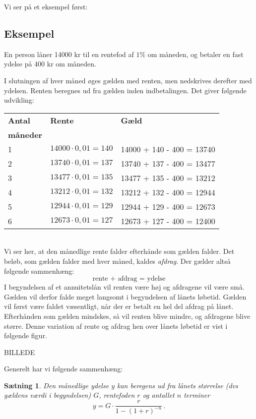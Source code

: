 \documentclass[12pt,oneside,a4paper]{article}
\newtheorem{thm}{Sætning}[section]
\begin{document}
Vi ser på et eksempel først:
\begin{tcolorbox}
\subsection{Eksempel}
En person låner 14000 kr til en rentefod af $1\%$ om måneden, og betaler en fast
ydelse på 400 kr om måneden.

I slutningen af hver måned øges gælden med renten, men nedskrives derefter med
ydelsen. Renten beregnes ud fra gælden inden indbetalingen.  Det giver
følgende udvikling:
\\

\begin{tabular}{|l|l|l|}
    \hline
    \textbf{Antal} & \textbf{Rente} & \textbf{Gæld} \\
    \textbf{måneder} &  & \\
    \hline
    1 & $14000\cdot 0,01 = 140$ & 14000 + 140 - 400 = 13740 \\
    \hline
    2 & $13740\cdot 0,01 = 137$ & 13740 + 137 - 400 = 13477 \\
    \hline
    3 & $13477\cdot 0,01 = 135$ & 13477 + 135 - 400 = 13212 \\
    \hline
    4 & $13212\cdot 0,01 = 132$ & 13212 + 132 - 400 = 12944 \\
    \hline
    5 & $12944\cdot 0,01 = 129$ & 12944 + 129 - 400 = 12673 \\
    \hline
    6 & $12673\cdot 0,01 = 127$ & 12673 + 127 - 400 = 12400 \\
    \hline
\end{tabular}
\\

Vi ser her, at den månedlige rente falder efterhånde som gælden falder. Det
beløb, som gælden falder med hver måned, kaldes \emph{afdrag}. Der gælder
altså følgende sammenhæng:
\[
\mbox{rente + afdrag = ydelse}
\]
I begyndelsen af et annuitetslån vil renten være høj og afdragene vil være små.
Gælden vil derfor falde meget langsomt i begyndelsen af lånets løbetid.
Gælden vil først være faldet væsentligt, når der er betalt en hel del
afdrag på lånet.  Efterhånden som gælden mindskes, så vil renten blive
mindre, og afdragene blive større. Denne variation af rente og afdrag 
hen over lånets løbetid er vist i følgende figur.

BILLEDE

\end{tcolorbox}

Generelt har vi følgende sammenhæng:
\begin{tcolorbox}
\begin{thm}
    Den månedlige ydelse $y$ kan beregens ud fra lånets størrelse 
  (dvs gældens værdi i begyndelsen) $G$, rentefoden $r$ og antallet $n$ terminer
\[
    y = G\cdot\frac{r}{1-(1+r)^{-n}}\,.
\]
\end{thm}
\end{tcolorbox}
\end{document}
